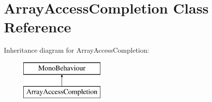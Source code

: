 \hypertarget{class_array_access_completion}{}\section{Array\+Access\+Completion Class Reference}
\label{class_array_access_completion}
Inheritance diagram for Array\+Access\+Completion\+:\begin{figure}[H]
\begin{center}
\leavevmode
\includegraphics[height=2.000000cm]{class_array_access_completion}
\end{center}
\end{figure}
